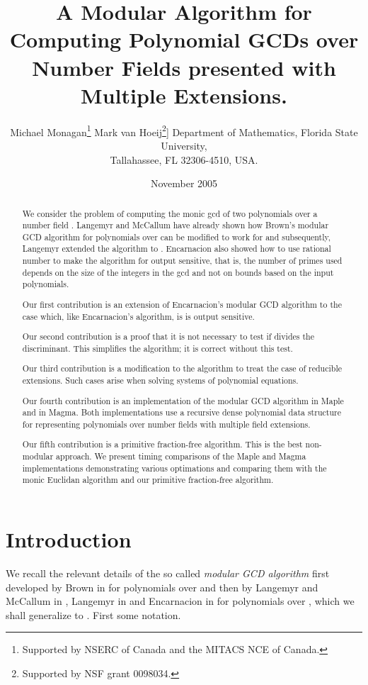 \documentclass[10pt]{article}
\author{
  Michael Monagan\thanks{Supported by NSERC of Canada
  and the MITACS NCE of Canada.}\footnotemark[1] \quad
  Mark van Hoeij\thanks{Supported by NSF grant
  0098034.}\footnotemark[2] \10pt]
 \footnotemark[2]
  Department of Mathematics, Florida State University, \\
  Tallahassee, FL 32306-4510, USA.
}
\title{A Modular Algorithm for Computing
Polynomial GCDs over Number Fields presented with Multiple Extensions.}
\date{November 2005}
\begin{document}
\maketitle
\begin{abstract}
We consider the problem of computing the monic gcd of two
polynomials over a number field .
Langemyr and McCallum have already shown how Brown's modular
GCD algorithm for polynomials over  can be modified to work
for  and subsequently, Langemyr extended the
algorithm to .  Encarnacion also showed how to use
rational number to make the algorithm for  output sensitive,
that is, the number of primes used depends on the size of the integers
in the gcd and not on bounds based on the input polynomials.

Our first contribution is an extension of Encarnacion's modular GCD
algorithm to the case  which, like Encarnacion's algorithm,
is is output sensitive.

Our second contribution is a proof that it is not necessary
to test if  divides the discriminant.
This simplifies the algorithm; it is correct without this test.

Our third contribution is a modification to the algorithm to treat
the case of reducible extensions.  Such cases arise when
solving systems of polynomial equations.



Our fourth contribution is an implementation of the
modular GCD algorithm in Maple and in Magma.
Both implementations use a recursive dense polynomial data structure for
representing polynomials over number fields with multiple field
extensions.

Our fifth contribution is a primitive fraction-free algorithm.
This is the best non-modular approach.
We present timing comparisons of the Maple and Magma implementations 
demonstrating various optimations and comparing them with the monic Euclidan
algorithm and our primitive fraction-free algorithm.

\end{abstract}

\section{Introduction}
We recall the relevant details of the so called {\em modular GCD algorithm}
first developed by Brown in \cite{Brown} for polynomials over  and then
by Langemyr and McCallum in \cite{Langemyr}, Langemyr in \cite{AAECC} and
Encarnacion in \cite{Encarnacion} for polynomials over ,
which we shall generalize to .
First some notation.
\end{document}
